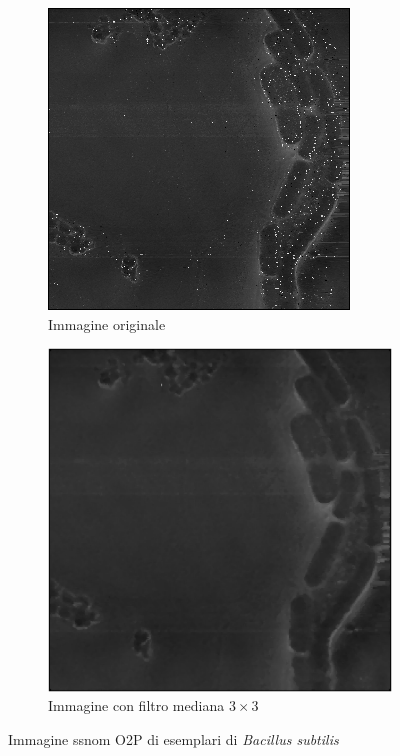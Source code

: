 \documentclass[../main.tex]{subfiles}
\begin{document}
	\begin{figure}[ht]
		\centering
		\begin{subfigure}{0.4\linewidth}
			\centering
			\includegraphics[keepaspectratio, width=\linewidth]{images/bs_o2p.png}
			\caption{Immagine originale}
		\end{subfigure}
		\hspace{20pt}
		\begin{subfigure}{0.4\linewidth}
			\centering
			\includegraphics[keepaspectratio, width=\linewidth]{images/bs_o2p_medfilt.png}
			\caption{Immagine con filtro mediana $3\times3$}
		\end{subfigure}
		\caption[Immagine s-SNOM O2P di esemplari di \textit{Bacillus subtilis}]{
			Immagine \acrshort{ssnom} O2P di esemplari di \textit{Bacillus subtilis}}
	\end{figure}
	
\end{document}
